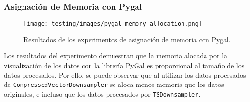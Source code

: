 \subsubsection{Asignación de Memoria con Pygal}
\label{exp:pygal-mem}

\begin{figure}[H]
    \centering
    \texttt{[image: testing/images/pygal\_memory\_allocation.png]}
    \caption{Resultados de los experimentos de asignación de memoria con Pygal.}
    \label{fig:pygal-memory-allocation}
\end{figure}

Los resultados del experimento demuestran que la memoria alocada por la visualización de los datos con la librería PyGal es proporcional al tamaño de los datos procesados. Por ello, se puede observar que al utilizar los datos procesados de \texttt{CompressedVectorDownsampler} se aloca menos memoria que los datos originales, e incluso que los datos procesados por \texttt{TSDownsampler}.
